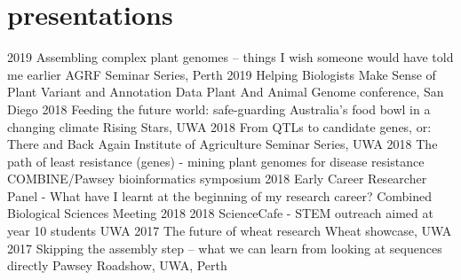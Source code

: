 \documentclass[]{friggeri-cv} %
\begin{document}
\section{presentations}
\begin{entrylist}
\entry
{2019}
{Assembling complex plant genomes – things I wish someone would have told me earlier}
{}
{AGRF Seminar Series, Perth}
\entry
{2019}
{Helping Biologists Make Sense of Plant Variant and Annotation Data}
{}
{Plant And Animal Genome conference, San Diego}
\entry
{2018}
{Feeding the future world: safe-guarding Australia’s food bowl in a changing climate}
{}
{Rising Stars, UWA}
\entry
{2018}
{From QTLs to candidate genes, or: There and Back Again}
{}
{Institute of Agriculture Seminar Series, UWA}
\entry
{2018}
{The path of least resistance (genes) - mining plant genomes for disease resistance}
{}
{COMBINE/Pawsey bioinformatics symposium}
\entry
{2018}
{Early Career Researcher Panel - What have I learnt at the beginning of my research career?}
{}
{Combined Biological Sciences Meeting 2018}
\entry
{2018}
{ScienceCafe - STEM outreach aimed at year 10 students}
{}
{UWA}
\entry
{2017}
{The future of wheat research}
{}
{Wheat showcase, UWA}
\entry
{2017}
{Skipping the assembly step – what we can learn from looking at sequences directly}
{}
{Pawsey Roadshow, UWA, Perth}
\end{entrylist}
\end{document}
